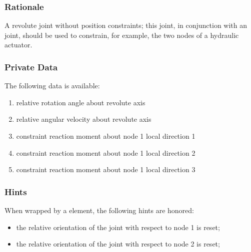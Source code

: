 \subsubsection{Rationale}
A revolute joint without position constraints; this joint, in conjunction
with an  joint, should be used to constrain, for example,
the two nodes of a hydraulic actuator.

\subsubsection{Private Data}
The following data is available:
\begin{enumerate}
\item {} relative rotation angle about revolute axis
\item {} relative angular velocity about revolute axis
\item {} constraint reaction moment about node 1 local direction 1
\item {} constraint reaction moment about node 1 local direction 2
\item {} constraint reaction moment about node 1 local direction 3
\end{enumerate}

\subsubsection{Hints}
When wrapped by a  element, the following hints are honored:
\begin{itemize}
\item {} the relative orientation of the joint
with respect to node 1 is reset;
\item {} the relative orientation of the joint
with respect to node 2 is reset;
\end{itemize}





